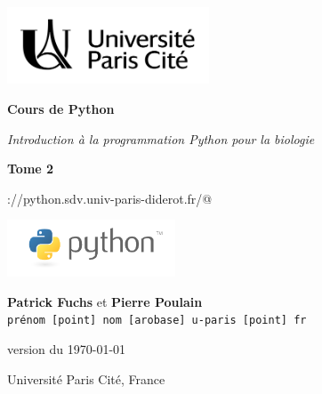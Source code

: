 \documentclass[10pt]{book}
\begin{document}
\thispagestyle{empty}

\begin{titlepage}

\begin{center}

\includegraphics[width=6cm]{img/logo_Univ_Paris_Cite.png}

\vspace{3cm}

{\Huge \bf Cours de Python}
\vspace{0.5cm}

{\itshape \Large
Introduction à la programmation Python pour la biologie
}
\vspace{0.5cm}

{\bf \Large Tome 2}
\vspace{0.5cm}

\verb@https://python.sdv.univ-paris-diderot.fr/@
\vspace{4cm}

\includegraphics[width=5cm]{img/logo_python.png} \\
\vspace{0.5cm}

{\large
	{\bf Patrick Fuchs} et {\bf Pierre Poulain} \\
	{\tt prénom [point] nom [arobase] u-paris [point] fr}
}
\vspace{4cm}

version du \today
\vspace{2cm}

Université Paris Cité, France

\vfill


\end{center}
\end{titlepage}
\end{document}

